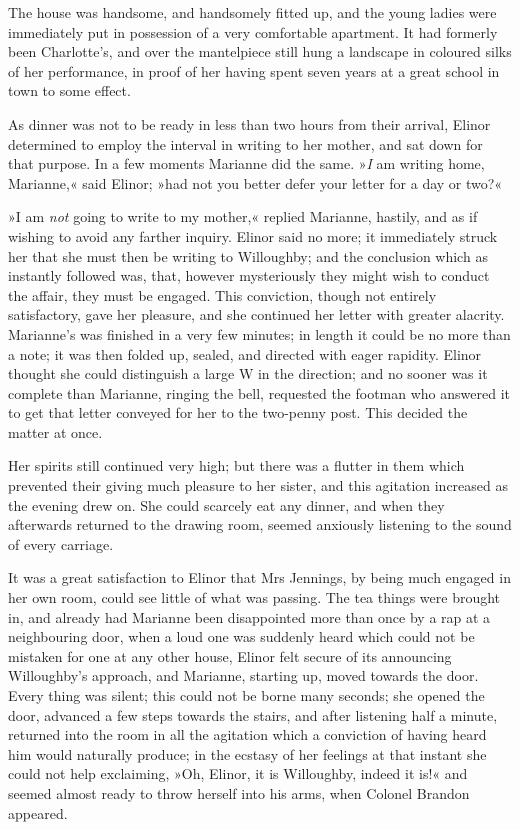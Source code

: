 The house was handsome, and handsomely fitted up, and the young ladies were immediately put in possession of a very comfortable apartment. It had formerly been Charlotte’s, and over the mantelpiece still hung a landscape in coloured silks of her performance, in proof of her having spent seven years at a great school in town to some effect.

As dinner was not to be ready in less than two hours from their arrival, Elinor determined to employ the interval in writing to her mother, and sat down for that purpose. In a few moments Marianne did the same. »\textit{I} am writing home, Marianne,« said Elinor; »had not you better defer your letter for a day or two?«

»I am \textit{not} going to write to my mother,« replied Marianne, hastily, and as if wishing to avoid any farther inquiry. Elinor said no more; it immediately struck her that she must then be writing to Willoughby; and the conclusion which as instantly followed was, that, however mysteriously they might wish to conduct the affair, they must be engaged. This conviction, though not entirely satisfactory, gave her pleasure, and she continued her letter with greater alacrity. Marianne’s was finished in a very few minutes; in length it could be no more than a note; it was then folded up, sealed, and directed with eager rapidity. Elinor thought she could distinguish a large W in the direction; and no sooner was it complete than Marianne, ringing the bell, requested the footman who answered it to get that letter conveyed for her to the two-penny post. This decided the matter at once.

Her spirits still continued very high; but there was a flutter in them which prevented their giving much pleasure to her sister, and this agitation increased as the evening drew on. She could scarcely eat any dinner, and when they afterwards returned to the drawing room, seemed anxiously listening to the sound of every carriage.

It was a great satisfaction to Elinor that Mrs Jennings, by being much engaged in her own room, could see little of what was passing. The tea things were brought in, and already had Marianne been disappointed more than once by a rap at a neighbouring door, when a loud one was suddenly heard which could not be mistaken for one at any other house, Elinor felt secure of its announcing Willoughby’s approach, and Marianne, starting up, moved towards the door. Every thing was silent; this could not be borne many seconds; she opened the door, advanced a few steps towards the stairs, and after listening half a minute, returned into the room in all the agitation which a conviction of having heard him would naturally produce; in the ecstasy of her feelings at that instant she could not help exclaiming, »Oh, Elinor, it is Willoughby, indeed it is!« and seemed almost ready to throw herself into his arms, when Colonel Brandon appeared.

